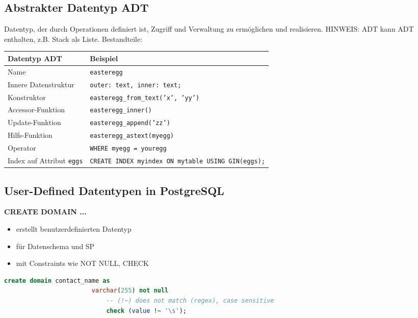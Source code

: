 \documentclass[a4paper, landscape, 8pt]{scrartcl}
\begin{document}
\begin{multicols*}{4}
        \subsection{Abstrakter Datentyp {\tiny ADT}}
        Datentyp, der durch Operationen definiert ist, Zugriff und Verwaltung zu ermöglichen und realisieren.
        HINWEIS: ADT kann ADT enthalten, z.B. Stack als Liste.
        Bestandteile:
        \begin{tabularx}{\columnwidth}{l | X}
            \textbf{Datentyp ADT} & \textbf{Beispiel} \\
            \hline
            Name & \texttt{easteregg} \\
            \hline
            Innere Datenstruktur & \texttt{outer: text, inner: text;} \\
            \hline
            Konstruktor & \texttt{easteregg\_from\_text('x', 'yy')} \\
            \hline
            Accessor-Funktion & \texttt{easteregg\_inner()} \\
            \hline
            Update-Funktion & \texttt{easteregg\_append('zz')} \\
            \hline
            Hilfs-Funktion & \texttt{easteregg\_astext(myegg)} \\
            \hline
            Operator & \texttt{WHERE myegg = youregg} \\
            \hline
            Index auf Attribut \texttt{eggs} & \texttt{CREATE INDEX myindex ON mytable USING GIN(eggs);}
        \end{tabularx}

        \subsection{User-Defined Datentypen in PostgreSQL}
        \begin{multicols*}{2}
            \textbf{CREATE DOMAIN ...}
            \begin{itemize}
                \item erstellt benutzerdefinierten Datentyp
                \item für Datenschema und SP
                \item mit Constraints wie NOT NULL, CHECK
            \end{itemize}
            \begin{lstlisting}[language=sql]
                    create domain contact_name as
                        varchar(255) not null
                            -- (!~) does not match (regex), case sensitive
                            check (value !~ '\s');
            \end{lstlisting}


\end{multicols*}
\end{multicols*}
\end{document}
